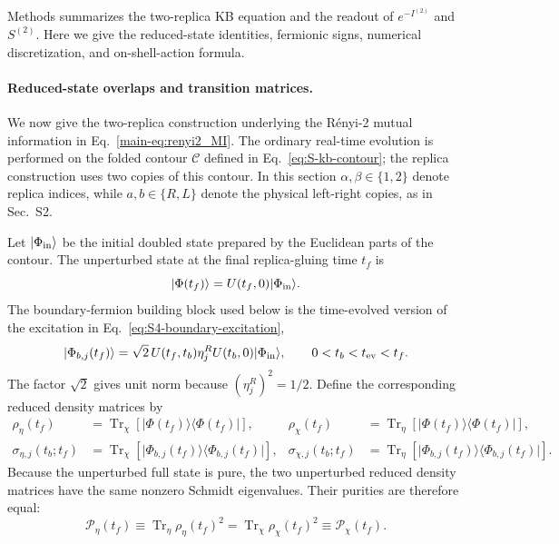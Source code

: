 \documentclass[11pt,a4paper]{article}
\begin{document}
\noindent
Methods summarizes the two-replica KB equation and the readout of
\(e^{-I^{(2)}}\) and \(S^{(2)}\). Here we give the reduced-state identities,
fermionic signs, numerical discretization, and on-shell-action formula.

\paragraph*{Reduced-state overlaps and transition matrices.}

We now give the two-replica construction underlying the R\'enyi-2 mutual
information in Eq.~\eqref{main-eq:renyi2_MI}. The ordinary real-time evolution is
performed on the folded contour \(\mathcal C\) defined in
Eq.~\eqref{eq:S-kb-contour}; the replica construction uses two copies of this
contour. In this section \(\alpha,\beta\in\{1,2\}\) denote replica indices,
while \(a,b\in\{R,L\}\) denote the physical left-right copies, as in Sec.~S2.

Let \(\lvert\Phi_{\rm in}\rangle\) be the initial doubled state prepared by
the Euclidean parts of the contour. The unperturbed state at the final
replica-gluing time \(t_f\) is
\begin{equation}
  \lvert\Phi(t_f)\rangle
  =
  U(t_f,0)\lvert\Phi_{\rm in}\rangle .
\label{eq:S5-unperturbed-state}
\end{equation}
The boundary-fermion building block used below is the time-evolved version of
the excitation in Eq.~\eqref{eq:S4-boundary-excitation},
\begin{equation}
  \lvert\Phi_{b,j}(t_f)\rangle
  =
  \sqrt{2}\,
  U(t_f,t_b)\eta^R_j
  U(t_b,0)\lvert\Phi_{\rm in}\rangle,
  \qquad
  0<t_b<t_{\rm ev}<t_f .
\label{eq:S5-boundary-excitation}
\end{equation}
The factor \(\sqrt{2}\) gives unit norm because
\((\eta^R_j)^2=1/2\). Define the corresponding reduced density matrices by
\begin{equation}
\begin{aligned}
  \rho_\eta(t_f)
  &=
  \operatorname{Tr}_{\chi}
  \left[
  \lvert\Phi(t_f)\rangle\langle\Phi(t_f)\rvert
  \right],
  &
  \rho_\chi(t_f)
  &=
  \operatorname{Tr}_{\eta}
  \left[
  \lvert\Phi(t_f)\rangle\langle\Phi(t_f)\rvert
  \right],
  \\
  \sigma_{\eta,j}(t_b;t_f)
  &=
  \operatorname{Tr}_{\chi}
  \left[
  \lvert\Phi_{b,j}(t_f)\rangle
  \langle\Phi_{b,j}(t_f)\rvert
  \right],
  &
  \sigma_{\chi,j}(t_b;t_f)
  &=
  \operatorname{Tr}_{\eta}
  \left[
  \lvert\Phi_{b,j}(t_f)\rangle
  \langle\Phi_{b,j}(t_f)\rvert
  \right].
\end{aligned}
\label{eq:S5-reduced-density-matrices}
\end{equation}
Because the unperturbed full state is pure, the two unperturbed reduced
density matrices have the same nonzero Schmidt eigenvalues. Their purities
are therefore equal:
\begin{equation}
  \mathcal P_\eta(t_f)
  \equiv
  \operatorname{Tr}_{\eta}\rho_\eta(t_f)^2
  =
  \operatorname{Tr}_{\chi}\rho_\chi(t_f)^2
  \equiv
  \mathcal P_\chi(t_f).
\label{eq:S5-unperturbed-purity}
\end{equation}
\end{document}
